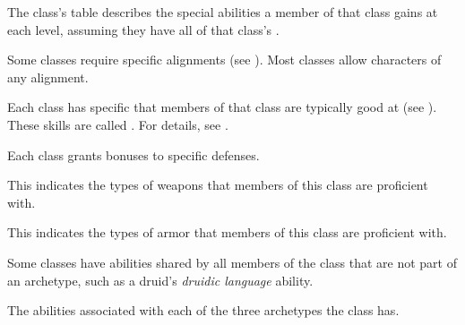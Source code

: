     The class's table describes the special abilities a member of that class gains at each level, assuming they have all of that class's .

    Some classes require specific alignments (see ).
    Most classes allow characters of any alignment.

    Each class has specific  that members of that class are typically good at (see ).
    These skills are called .
    For details, see .

    Each class grants bonuses to specific defenses.

    This indicates the types of weapons that members of this class are proficient with.

    This indicates the types of armor that members of this class are proficient with.

    Some classes have abilities shared by all members of the class that are not part of an archetype, such as a druid's \textit{druidic language} ability.

    The abilities associated with each of the three archetypes the class has.



